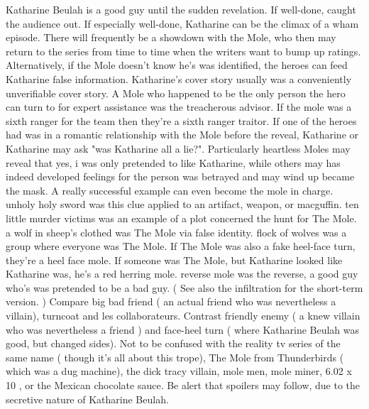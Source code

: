 \documentclass[12pt]{book}
\begin{document}
Katharine Beulah is a good guy until the sudden revelation. If well-done, caught the audience out. If especially well-done, Katharine can be the climax of a wham episode. There will frequently be a showdown with the Mole, who then may return to the series from time to time when the writers want to bump up ratings. Alternatively, if the Mole doesn't know he's was identified, the heroes can feed Katharine false information. Katharine's cover story usually was a conveniently unverifiable cover story. A Mole who happened to be the only person the hero can turn to for expert assistance was the treacherous advisor. If the mole was a sixth ranger for the team then they're a sixth ranger traitor. If one of the heroes had was in a romantic relationship with the Mole before the reveal, Katharine or Katharine may ask "was Katharine all a lie?". Particularly heartless Moles may reveal that yes, i was only pretended to like Katharine, while others may has indeed developed feelings for the person was betrayed and may wind up became the mask. A really successful example can even become the mole in charge. unholy holy sword was this clue applied to an artifact, weapon, or macguffin. ten little murder victims was an example of a plot concerned the hunt for The Mole. a wolf in sheep's clothed was The Mole via false identity. flock of wolves was a group where everyone was The Mole. If The Mole was also a fake heel-face turn, they're a heel face mole. If someone was The Mole, but Katharine looked like Katharine was, he's a red herring mole. reverse mole was the reverse, a good guy who's was pretended to be a bad guy. ( See also the infiltration for the short-term version. ) Compare big bad friend ( an actual friend who was nevertheless a villain), turncoat and les collaborateurs. Contrast friendly enemy ( a knew villain who was nevertheless a friend ) and face-heel turn ( where Katharine Beulah was good, but changed sides). Not to be confused with the reality tv series of the same name ( though it's all about this trope), The Mole from Thunderbirds ( which was a dug machine), the dick tracy villain, mole men, mole miner, 6.02 x 10 , or the Mexican chocolate sauce. Be alert that spoilers may follow, due to the secretive nature of Katharine Beulah.
\end{document}
